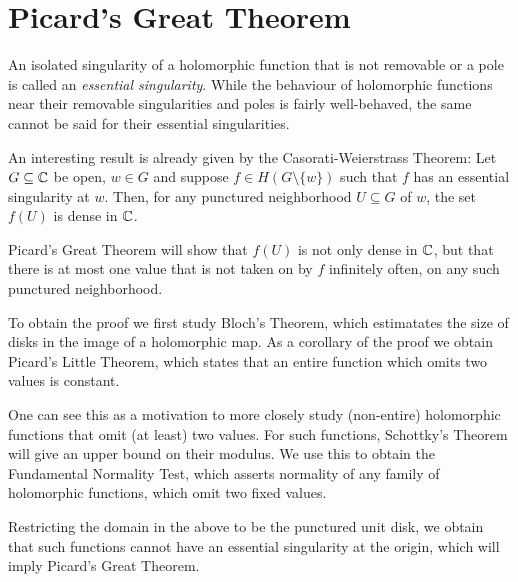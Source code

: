 \chapter{Picard's Great Theorem}
\label{ch:picards-great-theorem}

An isolated singularity of a holomorphic function that is not removable or a pole is called an \emph{essential singularity}. While the behaviour of holomorphic functions near their removable singularities and poles is fairly well-behaved, the same cannot be said for their essential singularities.

An interesting result is already given by the Casorati-Weierstrass Theorem: Let $G \subseteq \mathbb{C}$ be open, $w \in G$ and suppose $f \in H(G \setminus \{ w \})$ such that $f$ has an essential singularity at $w$. Then, for any punctured neighborhood $U \subseteq G$ of $w$, the set $f(U)$ is dense in $\mathbb{C}$.

Picard's Great Theorem will show that $f(U)$ is not only dense in $\mathbb{C}$, but that there is at most one value that is not taken on by $f$ infinitely often, on any such punctured neighborhood.

To obtain the proof we first study Bloch's Theorem, which estimatates the size of disks in the image of a holomorphic map. As a corollary of the proof we obtain Picard's Little Theorem, which states that an entire function which omits two values is constant.

One can see this as a motivation to more closely study (non-entire) holomorphic functions that omit (at least) two values. For such functions, Schottky's Theorem will give an upper bound on their modulus. We use this to obtain the Fundamental Normality Test, which asserts normality of any family of holomorphic functions, which omit two fixed values.

Restricting the domain in the above to be the punctured unit disk, we obtain that such functions cannot have an essential singularity at the origin, which will imply Picard's Great Theorem.




